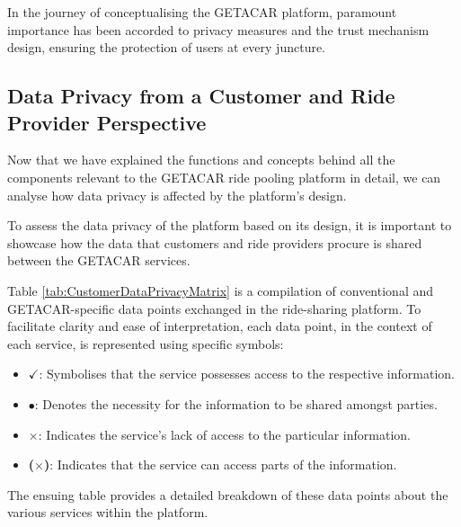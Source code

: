In the journey of conceptualising the GETACAR platform, paramount importance has been accorded to privacy measures and the trust mechanism design, ensuring the protection of users  at every juncture. 

\subsection{Data Privacy from a Customer and Ride Provider Perspective}
Now that we have explained the functions and concepts behind all the components relevant to the GETACAR ride pooling platform in detail, we can analyse how data privacy is  affected by the platform's design.

To assess the data privacy of the platform based on its design, it is important to showcase how the data that customers and ride providers procure is shared between the GETACAR services.

Table \ref{tab:CustomerDataPrivacyMatrix} is a compilation of conventional and GETACAR-specific data points  exchanged in the ride-sharing platform.
To facilitate clarity and ease of interpretation, each data point, in the context of each service, is represented using specific symbols:

\begin{itemize}
    \item \textbf{$\checkmark$}: Symbolises that the service possesses access to the respective information.
    \item \textbf{$\bullet$}: Denotes the necessity for the information to be shared amongst parties.
    \item \textbf{$\times$}: Indicates the service's lack of access to the particular information.
    \item \textbf{($\times$)}: Indicates that the service can access parts of the information.
\end{itemize}

The ensuing table provides a detailed breakdown of these data points about the various services within the platform.

